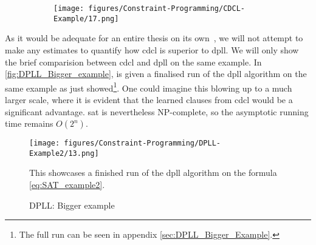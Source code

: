 \begin{figure}[H]
    \centering
    \begin{subfigure}[t]{0.48\textwidth}
        \centering
        \texttt{[image: figures/Constraint-Programming/CDCL-Example/17.png]}
    \end{subfigure}
\end{figure}

As it would be adequate for an entire thesis on its own~\cite{All-SAT-Solvers}, we will not attempt to make any estimates to quantify how \acrshort{cdcl} is superior to \acrshort{dpll}. We will only show the brief comparision between \acrshort{cdcl} and \acrshort{dpll} on the same example. In \autoref{fig:DPLL_Bigger_example}, is given a finalised run of the \acrshort{dpll} algorithm on the same example as just showed\footnote{The full run can be seen in appendix \autoref{sec:DPLL_Bigger_Example}.}. One could imagine this blowing up to a much larger scale, where it is evident that the learned clauses from \acrshort{cdcl} would be a significant advantage. \acrshort{sat} is nevertheless NP-complete, so the asymptotic running time remains \(O(2^n)\).  

\begin{figure}[H]
    \centering
    \texttt{[image: figures/Constraint-Programming/DPLL-Example2/13.png]}
    \caption{DPLL: Bigger example}
    \small
    \raggedright 
    This showcases a finished run of the \acrshort{dpll} algorithm on the formula \autoref{eq:SAT_example2}.
    \label{fig:DPLL_Bigger_example}
\end{figure}


